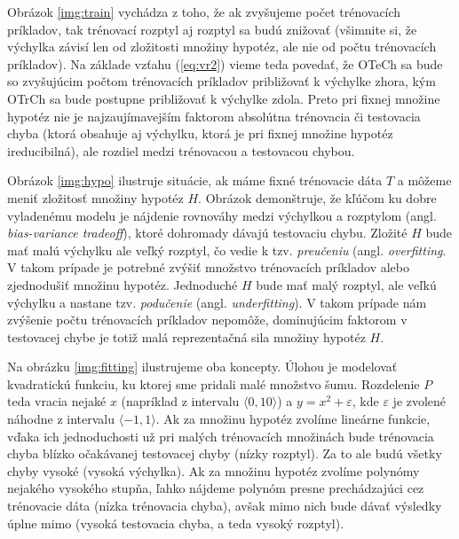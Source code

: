 Obrázok \ref{img:train} vychádza z toho, že ak zvyšujeme počet
trénovacích príkladov, tak trénovací rozptyl aj rozptyl sa budú
znižovať (všimnite si, že výchylka závisí len od zložitosti množiny
hypotéz, ale nie od počtu trénovacích príkladov). Na základe vzťahu
(\ref{eq:vr2}) vieme teda povedať, že OTeCh sa bude so zvyšujúcim
počtom trénovacích príkladov približovať k výchylke zhora, kým OTrCh
sa bude postupne približovať k výchylke zdola. Preto pri fixnej
množine hypotéz nie je najzaujímavejším faktorom absolútna trénovacia
či testovacia chyba (ktorá obsahuje aj výchylku, ktorá je pri fixnej
množine hypotéz ireducibilná), ale rozdiel medzi trénovacou a
testovacou chybou.

Obrázok \ref{img:hypo} ilustruje situácie, ak máme fixné trénovacie
dáta $T$ a môžeme meniť zložitosť množiny hypotéz $H$.  Obrázok
demonštruje, že kľúčom ku dobre vyladenému modelu je nájdenie
rovnováhy medzi výchylkou a rozptylom (angl. \emph{bias-variance tradeoff}),
ktoré dohromady dávajú
testovaciu chybu.  Zložité $H$ bude mať malú výchylku ale veľký
rozptyl, čo vedie k tzv. \emph{preučeniu} (angl. \emph{overfitting}. V
takom prípade je potrebné zvýšiť množstvo trénovacích príkladov alebo
zjednodušiť množinu hypotéz. Jednoduché $H$ bude mať malý rozptyl, ale
veľkú výchylku a nastane tzv. \emph{podučenie}
(angl. \emph{underfitting}). V takom prípade nám zvýšenie počtu
trénovacích príkladov nepomôže, dominujúcim faktorom v testovacej
chybe je totiž malá reprezentačná sila množiny hypotéz $H$.

Na obrázku \ref{img:fitting} ilustrujeme oba koncepty. Úlohou je modelovať
kvadratickú funkciu, ku ktorej sme pridali malé množstvo šumu. Rozdelenie
$P$ teda vracia nejaké $x$ (napríklad z intervalu $\langle 0, 10 \rangle$)
a $y = x^2 + \varepsilon$, kde $\varepsilon$ je zvolené náhodne z intervalu
$\langle -1, 1 \rangle$. Ak za množinu hypotéz zvolíme lineárne funkcie,
vďaka ich jednoduchosti už pri malých trénovacích množinách bude trénovacia
chyba blízko očakávanej testovacej chyby (nízky rozptyl). Za to ale budú
všetky chyby vysoké (vysoká výchylka). Ak za množinu hypotéz zvolíme polynómy
nejakého vysokého stupňa, ľahko nájdeme polynóm presne prechádzajúci cez trénovacie
dáta (nízka trénovacia chyba), avšak mimo nich bude dávať výsledky úplne mimo
(vysoká testovacia chyba, a teda vysoký rozptyl).

